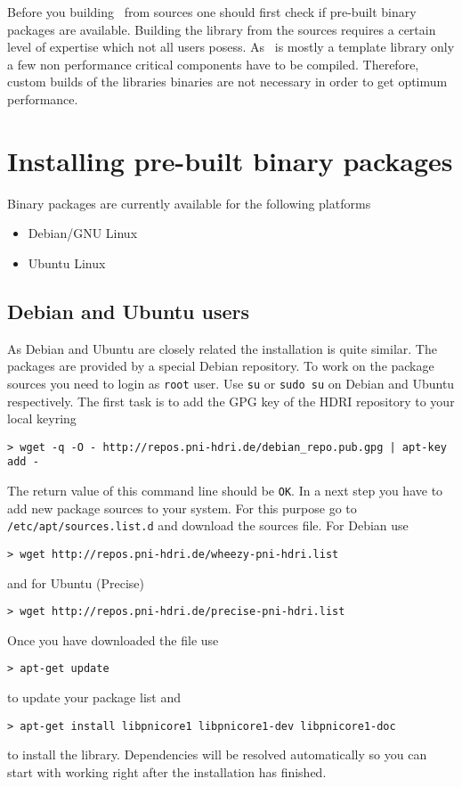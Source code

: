 
Before you building \libpnicore\ from sources one should first check if
pre-built binary packages are available. Building the library from the sources
requires a certain level of expertise which not all users posess. 
As
\libpnicore\ is mostly a template library only a few non performance critical
components have to be compiled. Therefore, custom builds of the libraries
binaries are not necessary in order to get optimum performance.

\section{Installing pre-built binary packages}

Binary packages are currently available for the following platforms 
\begin{itemize}
\item Debian/GNU Linux 
\item Ubuntu Linux 
\end{itemize}

\subsection{Debian and Ubuntu users}

As Debian and Ubuntu are closely related the installation is quite similar. 
The packages are provided by a special Debian repository. To work on the package
sources you need to login as {\tt root} user. Use {\tt su} or {\tt sudo su} on
Debian and Ubuntu respectively. 
The first task is to add the GPG key of the HDRI repository to your local
keyring
\begin{verbatim}
> wget -q -O - http://repos.pni-hdri.de/debian_repo.pub.gpg | apt-key add -
\end{verbatim}
The return value of this command line should be {\tt OK}.
In a next step you have to add new package sources to your system. For this
purpose go to {\tt /etc/apt/sources.list.d} and download the sources file. 
For Debian use
\begin{verbatim}
> wget http://repos.pni-hdri.de/wheezy-pni-hdri.list
\end{verbatim}
and for Ubuntu (Precise) 
\begin{verbatim}
> wget http://repos.pni-hdri.de/precise-pni-hdri.list
\end{verbatim}
Once you have downloaded the file use 
\begin{verbatim}
> apt-get update
\end{verbatim}
to update your package list and 
\begin{verbatim}
> apt-get install libpnicore1 libpnicore1-dev libpnicore1-doc
\end{verbatim}
to install the library. Dependencies will be resolved automatically so you can
start with working right after the installation has finished.


